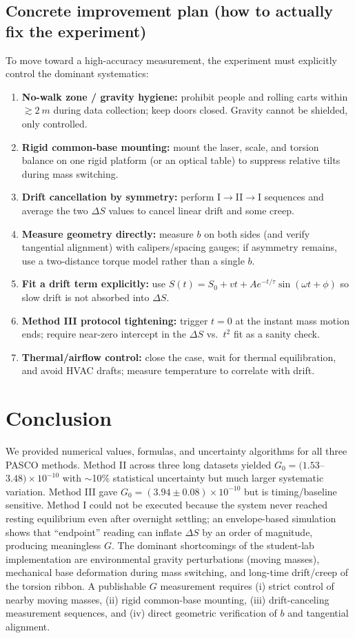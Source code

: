\documentclass[11pt]{article}
\begin{document}
\subsection*{Concrete improvement plan (how to actually fix the experiment)} 
To move toward a high-accuracy measurement, the experiment must explicitly control the dominant systematics:
\begin{enumerate}[itemsep=4pt]
\item \textbf{No-walk zone / gravity hygiene:} prohibit people and rolling carts within $\gtrsim\SI{2}{m}$ during data collection; keep doors closed. Gravity cannot be shielded, only controlled.
\item \textbf{Rigid common-base mounting:} mount the laser, scale, and torsion balance on one rigid platform (or an optical table) to suppress relative tilts during mass switching.
\item \textbf{Drift cancellation by symmetry:} perform I$\rightarrow$II$\rightarrow$I sequences and average the two $\Delta S$ values to cancel linear drift and some creep.
\item \textbf{Measure geometry directly:} measure $b$ on both sides (and verify tangential alignment) with calipers/spacing gauges; if asymmetry remains, use a two-distance torque model rather than a single $b$.
\item \textbf{Fit a drift term explicitly:} use $S(t)=S_0+vt+Ae^{-t/\tau}\sin(\omega t+\phi)$ so slow drift is not absorbed into $\Delta S$.
\item \textbf{Method III protocol tightening:} trigger $t=0$ at the instant mass motion ends; require near-zero intercept in the $\Delta S$ vs.\ $t^2$ fit as a sanity check.
\item \textbf{Thermal/airflow control:} close the case, wait for thermal equilibration, and avoid HVAC drafts; measure temperature to correlate with drift.
\end{enumerate}

\section{Conclusion}
We provided numerical values, formulas, and uncertainty algorithms for all three PASCO methods.
Method II across three long datasets yielded $G_0=(1.53$--$3.48)\times10^{-10}$ with $\sim$10\% statistical uncertainty but much larger systematic variation.
Method III gave $G_0=(3.94\pm0.08)\times10^{-10}$ but is timing/baseline sensitive.
Method I could not be executed because the system never reached resting equilibrium even after overnight settling; an envelope-based simulation shows that ``endpoint'' reading can inflate $\Delta S$ by an order of magnitude, producing meaningless $G$.
The dominant shortcomings of the student-lab implementation are environmental gravity perturbations (moving masses), mechanical base deformation during mass switching, and long-time drift/creep of the torsion ribbon.
A publishable $G$ measurement requires (i) strict control of nearby moving masses, (ii) rigid common-base mounting, (iii) drift-canceling measurement sequences, and (iv) direct geometric verification of $b$ and tangential alignment.
\end{document}
